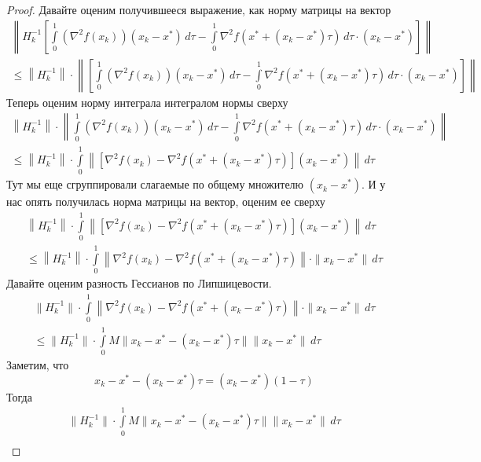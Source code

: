 \begin{proof}
  Давайте оценим получившееся выражение, как норму матрицы на вектор
  \begin{multline*}
  \left\|
  H_k^{-1} \left[ \int\limits_0^1 (\nabla^2 f(x_k))(x_k-x^{*})\,d\tau -
  \int\limits_0^1 \nabla^2f (x^{*} + (x_k - x^{*}) \tau )\,d\tau \cdot (x_k - x^{*})  \right]
  \right\|
  \\
  \le \left\|
  H_k^{-1} \right \| \cdot \left \| \left[ \int\limits_0^1 (\nabla^2 f(x_k))(x_k-x^{*})\,d\tau -
  \int\limits_0^1 \nabla^2f (x^{*} + (x_k - x^{*}) \tau )\,d\tau \cdot (x_k - x^{*})  \right]
  \right\|
  \end{multline*}
  Теперь оценим норму интеграла интегралом нормы сверху
  \begin{multline*}
  \left\|
  H_k^{-1} \right \| \cdot \left \|\int\limits_0^1 (\nabla^2 f(x_k))(x_k-x^{*})\,d\tau -
  \int\limits_0^1 \nabla^2f (x^{*} + (x_k - x^{*}) \tau )\,d\tau \cdot (x_k - x^{*})
  \right\|  \\ \le
  \left\|
  H_k^{-1} \right \|  \cdot \int\limits_0^1  \left \|  [\nabla^2 f(x_k)-
  \nabla^2f (x^{*} + (x_k - x^{*}) \tau )] (x_k - x^{*})  \right\| \,d\tau
  \end{multline*}
  Тут мы еще сгруппировали слагаемые по общему множителю $(x_k -x^{*})$.
  И у нас опять получилась  норма матрицы на вектор, оценим ее сверху
  \begin{multline*}
  \left\|
  H_k^{-1} \right \|  \cdot \int\limits_0^1  \left \|  [\nabla^2 f(x_k)-
  \nabla^2f (x^{*} + (x_k - x^{*}) \tau) ] (x_k - x^{*})  \right\| \,d\tau   \\
  \le
  \left\|
  H_k^{-1} \right \|  \cdot \int\limits_0^1  \left \|  \nabla^2 f(x_k)-
  \nabla^2f (x^{*} + (x_k - x^{*}) \tau) \right\| \cdot \| x_k - x^{*} \| \,d\tau
  \end{multline*}
  Давайте оценим разность Гессианов по Липшицевости.
  \begin{multline*}
  \| H_k^{-1} \|  \cdot \int\limits_0^1  \left \|  \nabla^2 f(x_k)-
  \nabla^2f (x^{*} + (x_k - x^{*}) \tau) \right\| \cdot \| x_k - x^{*} \| \,d\tau \\
  \le
  \| H_k^{-1}\| \cdot \int\limits_0^1 M \| x_k - x^{*} - (x_k - x^{*}) \tau\| \| x_k - x^{*} \| \,d\tau
  \end{multline*}
  Заметим, что
  \[
  x_k - x^{*} - (x_k - x^{*})\tau = (x_k - x^{*}) (1-\tau)
  \]
  Тогда
  \begin{multline*}
  \| H_k^{-1}\| \cdot \int\limits_0^1 M \| x_k - x^{*} - (x_k - x^{*}) \tau\| \| x_k - x^{*} \| \,d\tau \\

\end{multline*}
\end{proof}
